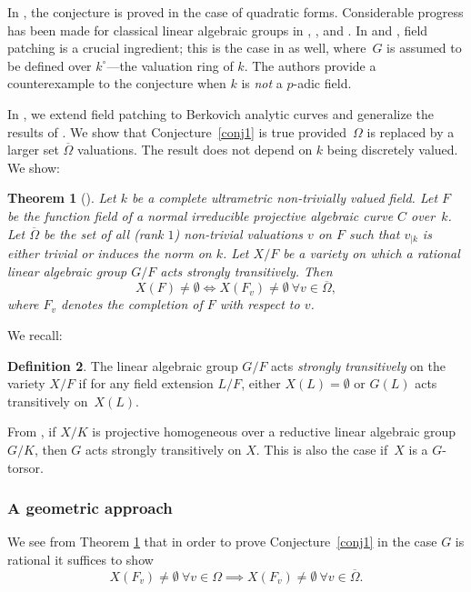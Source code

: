 \documentclass[JEP,XML,SOM,Unicode,NoFloatCountersInSection,published]{cedram}
\newtheorem{thm}{Theorem}[section]
\theoremstyle{definition}
\newtheorem{defn}[thm]{Definition}
\begin{document}
In \cite{ctps}, the conjecture is proved in the case of quadratic forms.
Considerable progress has been made for classical linear algebraic groups in \cite{parsur}, \cite{wu}, \cite{resur} and \cite{guhsur}. In \cite{ctps} and \cite{parsur}, field patching is a crucial ingredient; this is the case in \cite{cthhkps} as well, where~$G$ is assumed to be defined over $k^{\circ}$---the valuation ring of $k$. The authors provide a counterexample to the conjecture when $k$ is \emph{not} a $p$-adic field.

In \cite{une}, we extend field patching to Berkovich analytic curves and generalize the results of \cite{hhk}. We show that Conjecture~\ref{conj1} is true provided~$\Omega$ is replaced by a larger set $\overline{\Omega}$ valuations. The result does not depend on $k$ being discretely valued. We show:

\begin{thm}[{\cite[Cor.\,3.18]{une}}] \label{theoremval} Let $k$ be a complete ultrametric non-trivially valued field. Let $F$ be the function field of a normal irreducible projective algebraic curve $C$ over~$k$. Let $\overline{\Omega}$ be the set of all (rank $1$) non-trivial valuations $v$ on $F$ such that $v_{|k}$ is either trivial or induces the norm on $k$. Let $X/F$ be a variety on which a rational linear algebraic group $G/F$ acts \emph{strongly transitively}. Then
\[
X(F) \neq \emptyset \iff X(F_v) \neq \emptyset \ \forall v \in \overline{\Omega},
\]
where $F_v$ denotes the completion of $F$ with respect to $v$.
\end{thm}

We recall:

\begin{defn} \label{st}
The linear algebraic group $G/F$ acts \emph{strongly transitively} on the variety $X/F$ if for any field extension $L/F$, either $X(L)=\emptyset$ or $G(L)$ acts transitively on~$X(L)$.
\end{defn}

From \cite[Rem.\,3.9]{hhk}, if $X/K$ is projective homogeneous over a reductive linear algebraic group $G/K$, then $G$ acts strongly transitively on $X$. This is also the case if~$X$ is a $G$-torsor.

\subsubsection*{A geometric approach}
We see from Theorem \ref{theoremval} that in order to prove Conjecture~\ref{conj1} in the case $G$ is rational it suffices to show
\begin{equation}\label{rel1} {X(F_v) \neq \emptyset} \ {\forall v \in \Omega} \implies
X(F_v) \neq \emptyset \ \forall v \in \overline{\Omega}.
\end{equation}
\end{document}
